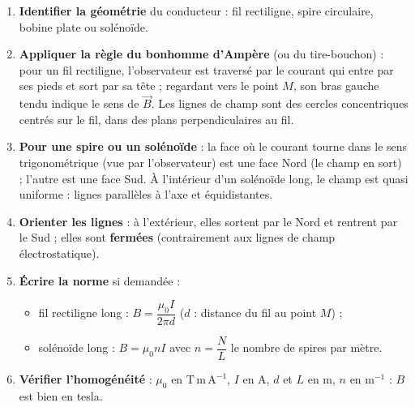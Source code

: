 \documentclass[11pt]{article}
\newcommand{\cle}[1]{{\popxbold\color{popdark}#1}}
\begin{document}
\begin{methode}
\begin{enumerate}
\item \textbf{Identifier la géométrie} du conducteur : fil rectiligne, spire circulaire, bobine plate ou solénoïde.
\item \textbf{Appliquer la règle du bonhomme d'Ampère} (ou du tire-bouchon) : pour un fil rectiligne, l'observateur est traversé par le courant qui entre par ses pieds et sort par sa tête ; regardant vers le point $M$, son bras gauche tendu indique le sens de $\vec{B}$. Les lignes de champ sont des \cle{cercles concentriques} centrés sur le fil, dans des plans perpendiculaires au fil.
\item \textbf{Pour une spire ou un solénoïde} : la face où le courant tourne dans le sens trigonométrique (vue par l'observateur) est une \cle{face Nord} (le champ en sort) ; l'autre est une face Sud. À l'intérieur d'un solénoïde long, le champ est \cle{quasi uniforme} : lignes parallèles à l'axe et équidistantes.
\item \textbf{Orienter les lignes} : à l'extérieur, elles sortent par le Nord et rentrent par le Sud ; elles sont \textbf{fermées} (contrairement aux lignes de champ électrostatique).
\item \textbf{Écrire la norme} si demandée :
\begin{itemize}
\item fil rectiligne long : $B = \dfrac{\mu_0 I}{2\pi d}$ ($d$ : distance du fil au point $M$) ;
\item solénoïde long : $B = \mu_0 n I$ avec $n = \dfrac{N}{L}$ le nombre de spires par mètre.
\end{itemize}
\item \textbf{Vérifier l'homogénéité} : $\mu_0$ en $\mathrm{T\,m\,A^{-1}}$, $I$ en A, $d$ et $L$ en m, $n$ en $\mathrm{m^{-1}}$ : $B$ est bien en tesla.
\end{enumerate}
\end{methode}
\end{document}
